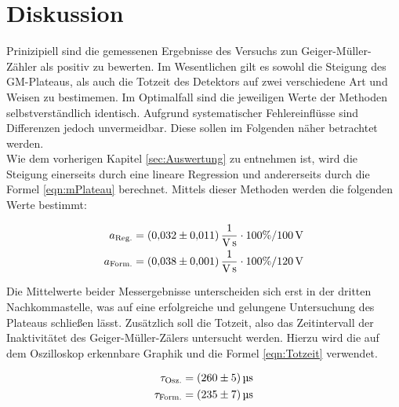



\section{Diskussion}

\noindent Prinizipiell sind die gemessenen Ergebnisse des Versuchs zun Geiger-Müller-Zähler als positiv zu bewerten. Im Wesentlichen 
gilt es sowohl die Steigung des GM-Plateaus, als auch die Totzeit des Detektors auf zwei verschiedene Art und Weisen zu bestimemen. 
Im Optimalfall sind die jeweiligen Werte der Methoden selbstverständlich identisch. Aufgrund systematischer Fehlereinflüsse
sind Differenzen jedoch unvermeidbar. Diese sollen im Folgenden näher betrachtet werden.\\

\noindent Wie dem vorherigen Kapitel \ref{sec:Auswertung} zu entnehmen ist, wird die Steigung einerseits durch eine lineare 
Regression und andererseits durch die Formel \eqref{eqn:mPlateau} berechnet. Mittels dieser Methoden werden die folgenden 
Werte bestimmt:

\begin{align*}
    a_\text{Reg.} &= \qty{0.032\pm0.011}{\per \volt \per \second} \cdot 100\% / \qty{100}{\volt}\\
    a_\text{Form.} &= \qty{0.038\pm0.001}{\per \volt \per \second} \cdot 100\% / \qty{120}{\volt}
\end{align*}

\noindent Die Mittelwerte beider Messergebnisse unterscheiden sich erst in der dritten Nachkommastelle, was auf eine erfolgreiche 
und gelungene Untersuchung des Plateaus schließen lässt. Zusätzlich soll die Totzeit, also das Zeitintervall der Inaktivitätet des 
Geiger-Müller-Zälers untersucht werden. Hierzu wird die auf dem Oszilloskop erkennbare Graphik und die Formel \eqref{eqn:Totzeit}
verwendet.

\begin{align*}
    \tau_\text{Osz.} &= \qty{260\pm5}{\micro \second}\\
    \tau_\text{Form.} &= \qty{235\pm7}{\micro \second}
\end{align*}

\noindent 

\label{sec:Diskussion}



